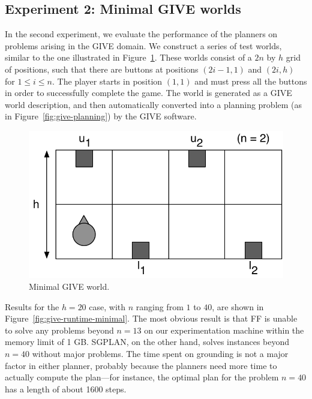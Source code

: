 \subsection{Experiment 2: Minimal GIVE worlds}
\label{sec:exper-2:-minim}

In the second experiment, we evaluate the performance of the planners
on problems arising in the GIVE domain. We construct a series of test
worlds, similar to the one illustrated in
Figure~\ref{fig:give-minimal}. These worlds consist of a $2n$ by $h$
grid of positions, such that there are buttons at positions $(2i-1,1)$
and $(2i,h)$ for $1 \leq i \leq n$. The player starts in position $(1,1)$
and must press all the buttons in order to successfully complete the game.
The world is generated as a GIVE world description, and then automatically
converted into a planning problem (as in Figure~\ref{fig:give-planning}) by
the GIVE software.

\begin{figure}
  \centering
  \includegraphics[width=0.8\columnwidth]{pic-buttons}
  \caption{Minimal GIVE world.}
  \label{fig:give-minimal}
\end{figure}

Results for the $h=20$ case, with $n$ ranging from $1$ to $40$, are shown
in Figure~\ref{fig:give-runtime-minimal}.  The most obvious result is that
FF is unable to solve any problems beyond $n=13$ on our experimentation
machine within the memory limit of 1 GB.  SGPLAN, on the other hand, solves
instances beyond $n=40$ without major problems.  The time spent on
grounding is not a major factor in either planner, probably because the
planners need more time to actually compute the plan---for instance, the
optimal plan for the problem $n=40$ has a length of about 1600 steps.

